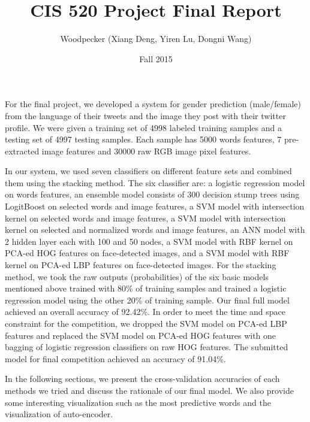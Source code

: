 \documentclass[english]{article}
\title{CIS 520 Project Final Report}
\author{Woodpecker (Xiang Deng, Yiren Lu, Dongni Wang)}
\date{Fall 2015}
\begin{document}
\maketitle
For the final project, we developed a system for gender prediction (male/female) from the language of their tweets and the image they post with their twitter profile. We were given a training set of 4998 labeled training samples and a testing set of 4997 testing samples. Each sample has 5000 words features, 7 pre-extracted image features and 30000 raw RGB image pixel features.\par
In our system, we used seven classifiers on different feature sets and combined them using the stacking method.
The six classifier are: a logistic regression model on words features, an ensemble model consists of 300 decision stump trees using LogitBoost on selected words and image features, a SVM model with intersection kernel on selected words and image features, a SVM model with intersection kernel on selected and normalized words and image features, an ANN model with 2 hidden layer each with 100 and 50 nodes, a SVM model with RBF kernel on PCA-ed HOG features on face-detected images, and a SVM model with RBF kernel on PCA-ed LBP features on face-detected images. For the stacking method, we took the raw outputs (probabilities) of the six basic models mentioned above trained with 80\% of training samples and trained a logistic regression model using the other 20\% of training sample. Our final full model achieved an overall accuracy of 92.42\%. In order to meet the time and space constraint for the competition, we dropped the SVM model on PCA-ed LBP features and replaced the SVM model on PCA-ed HOG features with one bagging of logistic regression classifiers on raw HOG features. The submitted model for final competition achieved an accuracy of 91.04\%. \par
In the following sections, we present the cross-validation accuracies of each methods we tried and discuss the rationale of our final model. We also provide some interesting visualization such as the most predictive words and the visualization of auto-encoder.  





\end{document}
